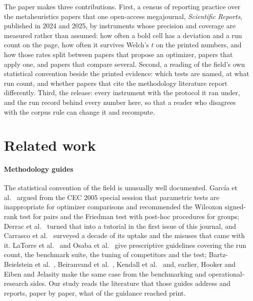 \documentclass[preprint,review,12pt]{elsarticle}
\begin{document}
The paper makes three contributions. First, a census of reporting practice over the \nOListedSrep{} metaheuristics papers that one open-access megajournal, \emph{Scientific Reports}, published in 2024 and 2025, by instruments whose precision and coverage are measured rather than assumed: how often a bold cell has a deviation and a run count on the page, how often it survives Welch's $t$ on the printed numbers, and how those rates split between papers that propose an optimizer, papers that apply one, and papers that compare several. Second, a reading of the field's own statistical convention beside the printed evidence: which tests are named, at what run count, and whether papers that cite the methodology literature report differently. Third, the release: every instrument with the protocol it ran under, and the run record behind every number here, so that a reader who disagrees with the corpus rule can change it and recompute.

\section{Related work}
\label{sec:related}

\paragraph{Methodology guides} The statistical convention of the field is unusually well documented. García et al.\ \cite{garcia2009study} argued from the CEC 2005 special session that parametric tests are inappropriate for optimizer comparisons and recommended the Wilcoxon signed-rank test for pairs and the Friedman test with post-hoc procedures for groups; Derrac et al.\ \cite{derrac2011practical} turned that into a tutorial in the first issue of this journal, and Carrasco et al.\ \cite{carrasco2020recent} surveyed a decade of its uptake and the misuses that came with it. LaTorre et al.\ \cite{latorre2021prescription} and Osaba et al.\ \cite{osaba2021tutorial} give prescriptive guidelines covering the run count, the benchmark suite, the tuning of competitors and the test; Bartz-Beielstein et al.\ \cite{bartz2020benchmarking}, Beiranvand et al.\ \cite{beiranvand2017best}, Kendall et al.\ \cite{kendall2016good} and, earlier, Hooker \cite{hooker1995testing} and Eiben and Jelasity \cite{eiben2002critical} make the same case from the benchmarking and operational-research sides. Our study reads the literature that those guides address and reports, paper by paper, what of the guidance reached print.
\end{document}
